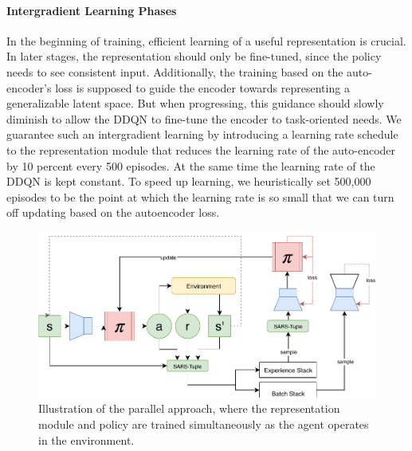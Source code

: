\paragraph{Intergradient Learning Phases} In the beginning of training, efficient learning of a useful representation is crucial. In later stages, the representation should only be fine-tuned, since the policy needs to see consistent input. Additionally, the training based on the auto-encoder's loss is supposed to guide the encoder towards representing a generalizable latent space. But when progressing, this guidance should slowly diminish to allow the DDQN to fine-tune the encoder to task-oriented needs. We guarantee such an intergradient learning by introducing a learning rate schedule to the representation module that reduces the learning rate of the auto-encoder by 10 percent every 500 episodes. At the same time the learning rate of the DDQN is kept constant. To speed up learning, we heuristically set 500,000 episodes to be the point at which the learning rate is so small that we can turn off updating based on the autoencoder loss. 

\begin{figure}[t]
	\centering
	\includegraphics[width=\textwidth]{img/full-model.pdf}
	\caption{Illustration of the parallel approach, where the representation module and policy are trained simultaneously as the agent operates in the environment.\label{fig:approaches}}
\end{figure}

